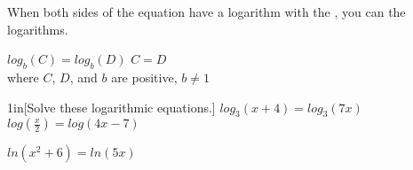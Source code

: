 \begin{minipage}{0.45\textwidth}
    When both sides of the equation
    have a logarithm with the ,
    you can  the logarithms.
\end{minipage}
\begin{minipage}{0.54\textwidth}
    \begin{myCenteredBox}[width=3.5in,]
        \centering\large
        $log_b(C) = log_b(D)$ \quad {\Large $\Leftrightarrow$} \quad $C = D$
        \normalsize\\[0.75\onelineskip]\small
        where $C$, $D$, and $b$ are positive, $b \neq 1$
    \end{myCenteredBox}
    
\end{minipage}


\begin{my2Problems}{1in}[Solve these logarithmic equations.]
    {
        $log_3(x+4) = log_3(7x)$
    }
    {
        $log(\frac{x}{2}) = log(4x-7)$
    }
\end{my2Problems}
\begin{myWideProblem}{1.4in}
    {
        $ln(x^2+6) = ln(5x)$
    }
\end{myWideProblem}
